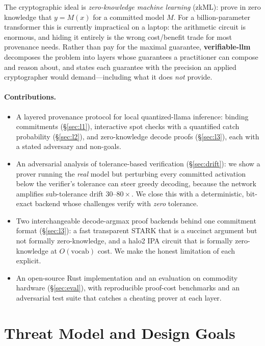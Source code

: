 \documentclass[11pt]{article}
\begin{document}
The cryptographic ideal is \emph{zero-knowledge machine learning} (zkML): prove
in zero knowledge that $y = M(x)$ for a committed model $M$. For a
billion-parameter transformer this is currently impractical on a laptop: the
arithmetic circuit is enormous, and hiding it entirely is the wrong cost/benefit
trade for most provenance needs. Rather than pay for the maximal guarantee,
\textbf{verifiable-llm} decomposes the problem into layers whose guarantees a
practitioner can compose and reason about, and states each guarantee with the
precision an applied cryptographer would demand---including what it does
\emph{not} provide.

\paragraph{Contributions.}
\begin{itemize}[leftmargin=1.2em,itemsep=2pt]
\item A layered provenance protocol for local quantized-llama inference:
binding commitments (\S\ref{sec:l1}), interactive spot checks with a quantified
catch probability (\S\ref{sec:l2}), and zero-knowledge decode proofs
(\S\ref{sec:l3}), each with a stated adversary and non-goals.
\item An adversarial analysis of tolerance-based verification
(\S\ref{sec:drift}): we show a prover running the \emph{real} model but
perturbing every committed activation below the verifier's tolerance can steer
greedy decoding, because the network amplifies sub-tolerance drift
$30$--$80\times$. We close this with a deterministic, bit-exact backend whose
challenges verify with \emph{zero} tolerance.
\item Two interchangeable decode-argmax proof backends behind one commitment
format (\S\ref{sec:l3}): a fast transparent STARK that is a succinct argument
but not formally zero-knowledge, and a halo2 IPA circuit that is formally
zero-knowledge at $O(\text{vocab})$ cost. We make the honest limitation of each
explicit.
\item An open-source Rust implementation and an evaluation on commodity hardware
(\S\ref{sec:eval}), with reproducible proof-cost benchmarks and an adversarial
test suite that catches a cheating prover at each layer.
\end{itemize}

\section{Threat Model and Design Goals}\label{sec:threat}
\end{document}
